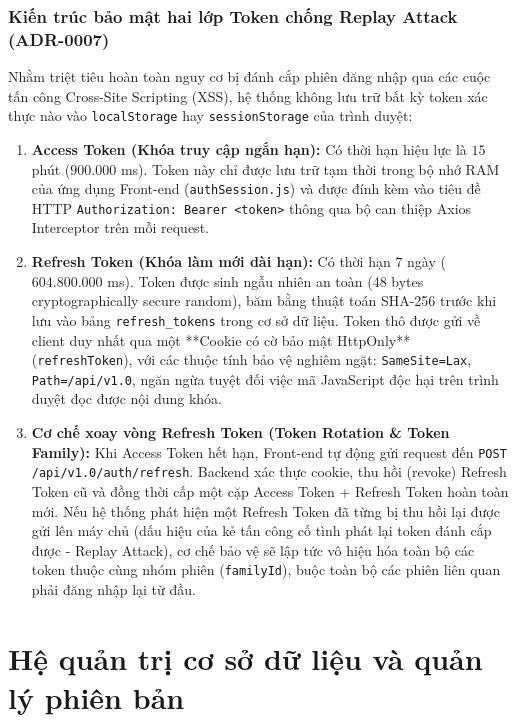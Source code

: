 \subsubsection{Kiến trúc bảo mật hai lớp Token chống Replay Attack (ADR-0007)}
Nhằm triệt tiêu hoàn toàn nguy cơ bị đánh cắp phiên đăng nhập qua các cuộc tấn công Cross-Site Scripting (XSS), hệ thống không lưu trữ bất kỳ token xác thực nào vào \texttt{localStorage} hay \texttt{sessionStorage} của trình duyệt:
\begin{enumerate}[label=\arabic*., leftmargin=1.5cm]
    \item \textbf{Access Token (Khóa truy cập ngắn hạn):} Có thời hạn hiệu lực là $15$ phút ($900.000$ ms). Token này chỉ được lưu trữ tạm thời trong bộ nhớ RAM của ứng dụng Front-end (\texttt{authSession.js}) và được đính kèm vào tiêu đề HTTP \texttt{Authorization: Bearer <token>} thông qua bộ can thiệp Axios Interceptor trên mỗi request.
    \item \textbf{Refresh Token (Khóa làm mới dài hạn):} Có thời hạn $7$ ngày ($604.800.000$ ms). Token được sinh ngẫu nhiên an toàn (48 bytes cryptographically secure random), băm bằng thuật toán SHA-256 trước khi lưu vào bảng \texttt{refresh\_tokens} trong cơ sở dữ liệu. Token thô được gửi về client duy nhất qua một **Cookie có cờ bảo mật HttpOnly** (\texttt{refreshToken}), với các thuộc tính bảo vệ nghiêm ngặt: \texttt{SameSite=Lax}, \texttt{Path=/api/v1.0}, ngăn ngừa tuyệt đối việc mã JavaScript độc hại trên trình duyệt đọc được nội dung khóa.
    \item \textbf{Cơ chế xoay vòng Refresh Token (Token Rotation \& Token Family):} Khi Access Token hết hạn, Front-end tự động gửi request đến \texttt{POST /api/v1.0/auth/refresh}. Backend xác thực cookie, thu hồi (revoke) Refresh Token cũ và đồng thời cấp một cặp Access Token + Refresh Token hoàn toàn mới. Nếu hệ thống phát hiện một Refresh Token đã từng bị thu hồi lại được gửi lên máy chủ (dấu hiệu của kẻ tấn công cố tình phát lại token đánh cắp được - Replay Attack), cơ chế bảo vệ sẽ lập tức vô hiệu hóa toàn bộ các token thuộc cùng nhóm phiên (\texttt{familyId}), buộc toàn bộ các phiên liên quan phải đăng nhập lại từ đầu.
\end{enumerate}

\section{Hệ quản trị cơ sở dữ liệu và quản lý phiên bản}
\label{sec:he_quan_tri_csdl}

